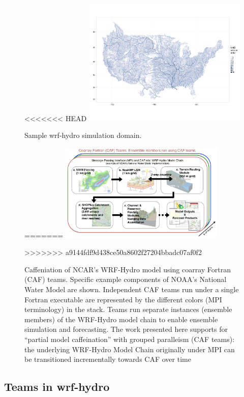 \begin{figure}
<<<<<<< HEAD
\includegraphics[width=0.7\textwidth]{figures/hydro-map}
\vspace{-36pt}
\caption{Sample \gls{wrf-hydro} simulation domain.}
=======
\includegraphics[width=0.7\textwidth]{figures/WRF-Hydro-caf-ens-model_chain.png}
\vspace{-7pt}
\caption{Caffeniation of NCAR's WRF-Hydro model using coarray Fortran (CAF)
  teams. Specific example components of  NOAA's National Water
  Model are shown. Independent CAF teams run under a single Fortran executable are represented by the different colors
  (MPI terminology) in the stack.  Teams run separate instances
  (ensemble members) of the WRF-Hydro model chain to enable ensemble
  simulation and forecasting. The work presented  here supports for ``partial model caffeination'' with grouped
  paralleism (CAF teams): the underlying WRF-Hydro Model Chain
  originally under MPI can be transitioned incrementally towards CAF
  over time}
>>>>>>> a9144fdf9d438ce50a8602f27204bbadc07af0f2
\end{figure}
%

\subsection{Teams in \gls{wrf-hydro}}
